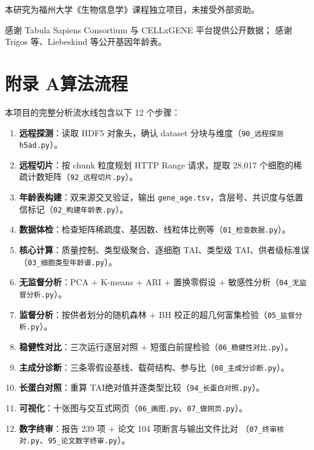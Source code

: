 \documentclass{cjc}
\newcommand{\tai}{\textrm{TAI}}
\newcommand{\code}[1]{\texttt{\small #1}}
\begin{document}
\vspace{0.35em}
本研究为福州大学《生物信息学》课程独立项目，未接受外部资助。

\vspace{0.35em}
感谢 Tabula Sapiens Consortium 与 CELLxGENE 平台提供公开数据；
感谢 Trigos 等、Liebeskind 等公开基因年龄表。





\appendix

\section*{附录 A\quad 算法流程}

本项目的完整分析流水线包含以下 12 个步骤：

\begin{enumerate}[label=\textbf{S\arabic*.}, leftmargin=3.4em]
  \item \textbf{远程探测}：读取 HDF5 对象头，确认 dataset 分块与维度（\code{90\_远程探测h5ad.py}）。
  \item \textbf{远程切片}：按 chunk 粒度规划 HTTP Range 请求，提取 28,017 个细胞的稀疏计数矩阵（\code{92\_远程切片.py}）。
  \item \textbf{年龄表构建}：双来源交叉验证，输出 \code{gene\_age.tsv}，含层号、共识度与低置信标记（\code{02\_构建年龄表.py}）。
  \item \textbf{数据体检}：检查矩阵稀疏度、基因数、线粒体比例等（\code{01\_检查数据.py}）。
  \item \textbf{核心计算}：质量控制、类型级聚合、逐细胞 \tai、类型级 \tai、供者级标准误（\code{03\_细胞类型年龄谱.py}）。
  \item \textbf{无监督分析}：PCA $+$ K-means $+$ ARI $+$ 置换零假设 $+$ 敏感性分析（\code{04\_无监督分析.py}）。
  \item \textbf{监督分析}：按供者划分的随机森林 $+$ BH 校正的超几何富集检验（\code{05\_监督分析.py}）。
  \item \textbf{稳健性对比}：三次运行逐层对照 $+$ 短蛋白前提检验（\code{06\_稳健性对比.py}）。
  \item \textbf{主成分诊断}：三条零假设基线、载荷结构、参与比（\code{08\_主成分诊断.py}）。
  \item \textbf{长蛋白对照}：重算 \tai 绝对值并逐类型比较（\code{94\_长蛋白对照.py}）。
  \item \textbf{可视化}：十张图与交互式网页（\code{06\_画图.py}、\code{07\_做网页.py}）。
  \item \textbf{数字终审}：报告 239 项 $+$ 论文 104 项断言与输出文件比对
        （\code{07\_终审核对.py}、\code{95\_论文数字终审.py}）。
\end{enumerate}
\end{document}
